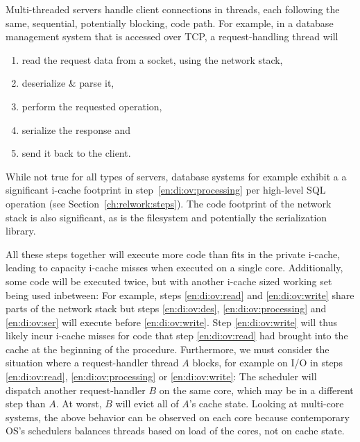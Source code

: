 \documentclass[12pt,a4paper]{book}
\begin{document}
Multi-threaded servers handle client connections in threads, each following the same, sequential, potentially blocking, code path.
For example, in a database management system that is accessed over TCP, a request-handling thread will
\begin{enumerate}[label=(\alph*)]
    \item read the request data from a socket, using the network stack, \label{en:di:ov:read}
    \item deserialize \& parse it, \label{en:di:ov:des}
    \item perform the requested operation,\label{en:di:ov:processing}
    \item serialize the response and \label{en:di:ov:ser}
    \item send it back to  the client. \label{en:di:ov:write}
\end{enumerate}
While not true for all types of servers, database systems for example exhibit a a significant i-cache footprint in step~\ref{en:di:ov:processing} per high-level SQL operation (see Section~\ref{ch:relwork:steps}).
The code footprint of the network stack is also significant, as is the filesystem and potentially the serialization library.

All these steps together will execute more code than fits in the private i-cache, leading to capacity i-cache misses when executed on a single core.
Additionally, some code will be executed twice, but with another i-cache sized working set being used inbetween:
For example, steps \ref{en:di:ov:read} and \ref{en:di:ov:write} share parts of the network stack but steps \ref{en:di:ov:des}, \ref{en:di:ov:processing} and \ref{en:di:ov:ser} will execute before \ref{en:di:ov:write}.
Step \ref{en:di:ov:write} will thus likely incur i-cache misses for code that step \ref{en:di:ov:read} had brought into the cache at the beginning of the procedure.
Furthermore, we must consider the situation where a request-handler thread $A$ blocks, for example on I/O in steps \ref{en:di:ov:read}, \ref{en:di:ov:processing} or \ref{en:di:ov:write}:
The scheduler will dispatch another request-handler $B$ on the same core, which may be in a different step than $A$.
At worst, $B$ will evict all of $A$'s cache state.
Looking at multi-core systems, the above behavior can be observed on each core because contemporary OS's schedulers balances threads based on load of the cores, not on cache state.
\end{document}
